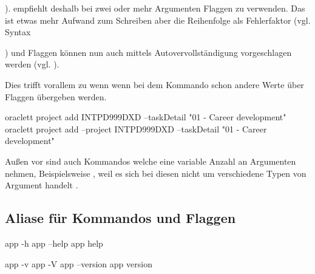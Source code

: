 \documentclass[oneside,bibliography=totocnumbered,BCOR=5mm]{scrbook}
\newenvironment{code}{\captionsetup{type=listing, skip=0pt}}{}
\begin{document}
). \cite{12factor} empfiehlt deshalb bei zwei oder mehr Argumenten Flaggen zu
verwenden. Das ist etwas mehr Aufwand zum Schreiben aber die Reihenfolge als
Fehlerfaktor (vgl. Syntax

) und Flaggen können nun auch mittels Autovervollständigung vorgeschlagen werden
(vgl. ).


Dies trifft vorallem zu wenn wenn bei dem Kommando schon andere Werte über
Flaggen übergeben werden.

\begin{code}
  \begin{shellcode}
oraclett project add INTPD999DXD --taskDetail "01 - Career development"
oraclett project add --project INTPD999DXD --taskDetail "01 - Career development"
  \end{shellcode}
  \medskip
\end{code}

Außen vor sind auch Kommandos welche eine variable Anzahl an Argumenten nehmen,
Beispielsweise , weil es sich bei diesen nicht
um verschiedene Typen von Argument handelt \parencite{12factor}.

\subsection{Aliase für Kommandos und Flaggen}

\begin{code}
  \begin{shellcode}
app -h
app --help
app help

app -v
app -V
app --version
app version
  \end{shellcode}
  \medskip
\end{code}

\newcommand\checkmark{\ttfamily{\char"2611}} %
\newcommand\cross{\ttfamily{\char"2610}}
\end{document}
